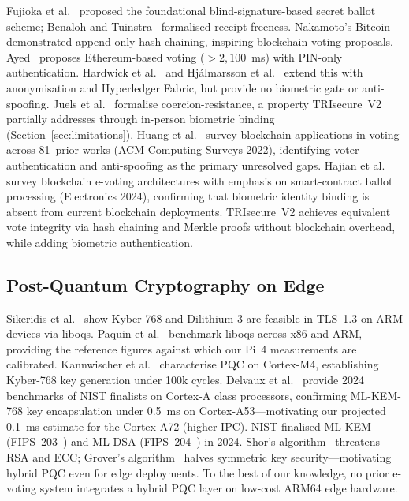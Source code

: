 \documentclass[pdflatex,sn-mathphys-num]{sn-jnl}%
\theoremstyle{thmstyleone}%
\theoremstyle{thmstyletwo}%
\theoremstyle{thmstylethree}%
\begin{document}
Fujioka et al.~\cite{fujioka1992practical} proposed the foundational
blind-signature-based secret ballot scheme; Benaloh and
Tuinstra~\cite{benaloh1994receipt} formalised receipt-freeness. Nakamoto's
Bitcoin~\cite{nakamoto2008bitcoin} demonstrated append-only hash chaining,
inspiring blockchain voting proposals. Ayed~\cite{ayed2017conceptual} proposes
Ethereum-based voting (\(>2{,}100\)~ms) with PIN-only authentication.
Hardwick et al.~\cite{hardwick2018voting} and Hj\'{a}lmarsson et
al.~\cite{hjalmarsson2018blockchain} extend this with anonymisation and
Hyperledger Fabric, but provide no biometric gate or anti-spoofing. Juels et
al.~\cite{juels2010coercion} formalise coercion-resistance, a property
TRIsecure~V2 partially addresses through in-person biometric binding
(Section~\ref{sec:limitations}). Huang et al.~\cite{huang2022blockchain_voting}
survey blockchain applications in voting across 81~prior works (ACM Computing
Surveys 2022), identifying voter authentication and anti-spoofing as the
primary unresolved gaps. Hajian et al.~\cite{hajian2024blockchain} survey
blockchain e-voting architectures with emphasis on smart-contract ballot
processing (Electronics 2024), confirming that biometric identity binding is
absent from current blockchain deployments. TRIsecure~V2 achieves equivalent
vote integrity via hash chaining and Merkle proofs without blockchain overhead,
while adding biometric authentication.

\subsection{Post-Quantum Cryptography on Edge}

Sikeridis et al.~\cite{sikeridis2020pqc} show Kyber-768 and Dilithium-3 are
feasible in TLS~1.3 on ARM devices via liboqs. Paquin et
al.~\cite{paquin2019oqs} benchmark liboqs across x86 and ARM, providing the
reference figures against which our Pi~4 measurements are calibrated.
Kannwischer et al.~\cite{kannwischer2019pqm4} characterise PQC on Cortex-M4,
establishing Kyber-768 key generation under 100k cycles. Delvaux et
al.~\cite{delvaux2024pqc_iot} provide 2024 benchmarks of NIST finalists on
Cortex-A class processors, confirming ML-KEM-768 key encapsulation under
0.5~ms on Cortex-A53---motivating our projected 0.1~ms estimate for the
Cortex-A72 (higher IPC). NIST finalised ML-KEM (FIPS~203~\cite{nist_fips203})
and ML-DSA (FIPS~204~\cite{nist_fips204}) in 2024.
Shor's algorithm~\cite{shor1994algorithms} threatens RSA and ECC; Grover's
algorithm~\cite{grover1996fast} halves symmetric key security---motivating
hybrid PQC even for edge deployments. To the best of our knowledge, no prior
e-voting system integrates a hybrid PQC layer on low-cost ARM64 edge hardware.
\end{document}
